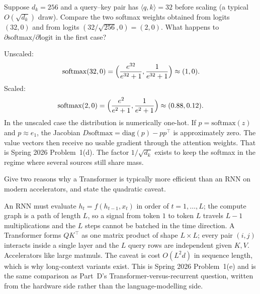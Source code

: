 \begin{exercise}
\label{ex:dlu-scale}
Suppose \(d_k=256\) and a query--key pair has \(\langle q,k\rangle=32\) before scaling (a typical \(O(\sqrt{d_k})\) draw). Compare the two softmax weights obtained from logits \((32,0)\) and from logits \((32/\sqrt{256},0)=(2,0)\). What happens to \(\partial\mathrm{softmax}/\partial\mathrm{logit}\) in the first case?
\end{exercise}

\begin{solution}
Unscaled:
\[
\mathrm{softmax}(32,0)
=
\Bigl(\frac{e^{32}}{e^{32}+1},\frac{1}{e^{32}+1}\Bigr)
\approx
(1,0).
\]
Scaled:
\[
\mathrm{softmax}(2,0)
=
\Bigl(\frac{e^{2}}{e^{2}+1},\frac{1}{e^{2}+1}\Bigr)
\approx
(0.88,0.12).
\]
In the unscaled case the distribution is numerically one-hot. If \(p=\mathrm{softmax}(z)\) and \(p\approx e_1\), the Jacobian \(D\mathrm{softmax}=\mathrm{diag}(p)-pp^\top\) is approximately zero. The value vectors then receive no usable gradient through the attention weights. That is Spring 2026 Problem~1(d). The factor \(1/\sqrt{d_k}\) exists to keep the softmax in the regime where several sources still share mass.
\end{solution}

\begin{exercise}
\label{ex:dlu-rnn}
Give two reasons why a Transformer is typically more efficient than an RNN on modern accelerators, and state the quadratic caveat.
\end{exercise}

\begin{solution}
An RNN must evaluate \(h_t=f(h_{t-1},x_t)\) in order of \(t=1,\dots,L\); the compute graph is a path of length \(L\), so a signal from token \(1\) to token \(L\) travels \(L-1\) multiplications and the \(L\) steps cannot be batched in the time direction. A Transformer forms \(QK^\top\) as one matrix product of shape \(L\times L\); every pair \((i,j)\) interacts inside a single layer and the \(L\) query rows are independent given \(K,V\). Accelerators like large matmuls. The caveat is cost \(O(L^{2}d)\) in sequence length, which is why long-context variants exist. This is Spring 2026 Problem~1(e) and is the same comparison as Part~D's Transformer-versus-recurrent question, written from the hardware side rather than the language-modelling side.
\end{solution}


